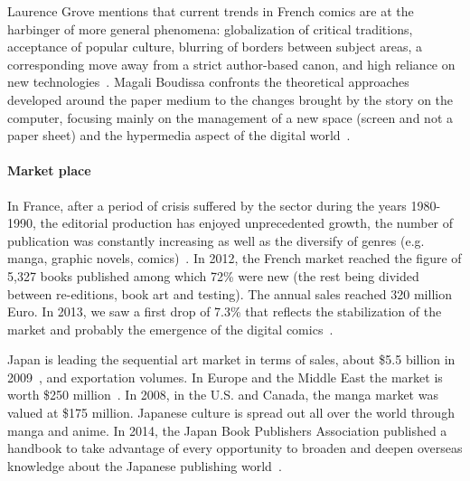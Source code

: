 
Laurence Grove mentions that current trends in French comics are at the harbinger of more general phenomena: globalization of critical traditions, acceptance of popular culture, blurring of borders between subject areas, a corresponding move away from a strict author-based canon, and high reliance on new technologies~\cite{Grove2014Bande}.
Magali Boudissa confronts the theoretical approaches developed around the paper medium to the changes brought by the story on the computer, focusing mainly on the management of a new space (screen and not a paper sheet) and the hypermedia aspect of the digital world~\cite{Boudissa2011Bande}.

\paragraph{Market place} %

In France, after a period of crisis suffered by the sector during the years 1980-1990, the editorial production has enjoyed unprecedented growth, the number of publication was constantly increasing as well as the diversify of genres (e.g. manga, graphic novels, comics)~\cite{Evans2012Lecture}.
In 2012, the French market reached the figure of 5,327 books published among which 72\% were new (the rest being divided between re-editions, book art and testing).
The annual sales reached 320 million Euro.
In 2013, we saw a first drop of 7.3\% that reflects the stabilization of the market and probably the emergence of the digital comics~\cite{Ratier2013Deceleration}.

Japan is leading the sequential art market in terms of sales, about \$5.5 billion in 2009~\cite{Syed2012}, and exportation volumes.
In Europe and the Middle East the market is worth \$250 million~\cite{Davidson2012}.
In 2008, in the U.S. and Canada, the manga market was valued at \$175 million.
Japanese culture is spread out all over the world through manga and anime.
In 2014, the Japan Book Publishers Association published a handbook to take advantage of every opportunity to broaden and deepen overseas knowledge about the Japanese publishing world~\cite{JBPA2014}.

